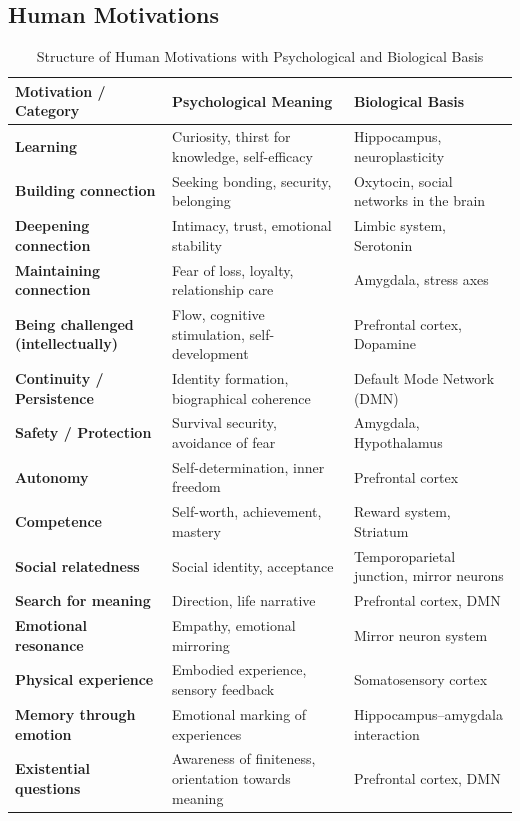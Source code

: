 \subsection*{Human Motivations}

\begin{table}[H]
\renewcommand{\arraystretch}{1.5}
\centering
\begin{tabular}{L{4cm}|L{5cm}|L{5cm}}
\textbf{Motivation / Category} & \textbf{Psychological Meaning} & \textbf{Biological Basis} \\
\hline
\textbf{Learning} & Curiosity, thirst for knowledge, self-efficacy & Hippocampus, neuroplasticity \\
\textbf{Building connection} & Seeking bonding, security, belonging & Oxytocin, social networks in the brain \\
\textbf{Deepening connection} & Intimacy, trust, emotional stability & Limbic system, Serotonin \\
\textbf{Maintaining connection} & Fear of loss, loyalty, relationship care & Amygdala, stress axes \\
\textbf{Being challenged (intellectually)} & Flow, cognitive stimulation, self-development & Prefrontal cortex, Dopamine \\
\textbf{Continuity / Persistence} & Identity formation, biographical coherence & Default Mode Network (DMN) \\
\textbf{Safety / Protection} & Survival security, avoidance of fear & Amygdala, Hypothalamus \\
\textbf{Autonomy} & Self-determination, inner freedom & Prefrontal cortex \\
\textbf{Competence} & Self-worth, achievement, mastery & Reward system, Striatum \\
\textbf{Social relatedness} & Social identity, acceptance & Temporoparietal junction, mirror neurons \\
\textbf{Search for meaning} & Direction, life narrative & Prefrontal cortex, DMN \\
\textbf{Emotional resonance} & Empathy, emotional mirroring & Mirror neuron system \\
\textbf{Physical experience} & Embodied experience, sensory feedback & Somatosensory cortex \\
\textbf{Memory through emotion} & Emotional marking of experiences & Hippocampus–amygdala interaction \\
\textbf{Existential questions} & Awareness of finiteness, orientation towards meaning & Prefrontal cortex, DMN \\
\end{tabular}
\caption{Structure of Human Motivations with Psychological and Biological Basis}
\label{tab:menschliche_motive}
\end{table}

